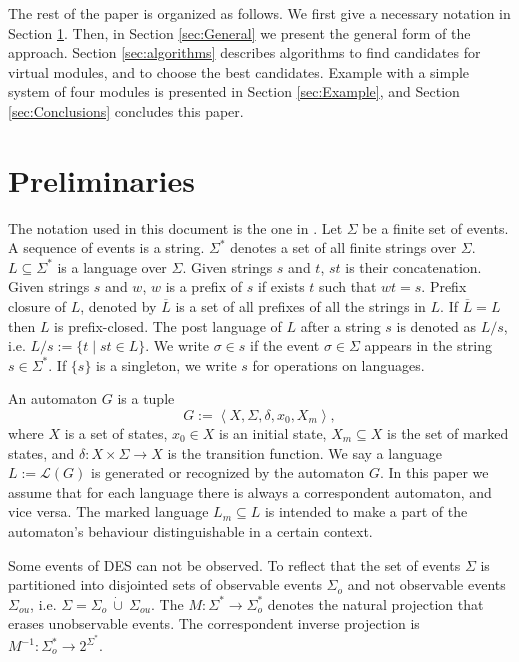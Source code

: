 \documentclass[a4paper, 10pt, conference]{ieeeconf}
\begin{document}
The rest of the paper is organized as follows. We first give a necessary
notation in Section \ref{sec:Preliminaries}. Then, in Section \ref{sec:General}
we present the general form of the approach. Section \ref{sec:algorithms}
describes algorithms to find candidates for virtual modules, and to choose the
best candidates. Example with a simple system of four modules is presented in
Section \ref{sec:Example}, and Section \ref{sec:Conclusions} concludes this
paper.


\section{Preliminaries}
\label{sec:Preliminaries}

The notation used in this document is the one in
\cite{cassandras_introduction_2010}.
Let $\Sigma$ be a finite set of events. A sequence of events is a string.
$\Sigma^*$ denotes a set of all finite strings over $\Sigma$.
$L\subseteq\Sigma^*$ is a language over $\Sigma$. Given strings $s$ and $t$,
$st$ is their concatenation. Given strings $s$ and $w$, $w$ is a prefix of $s$
if exists $t$ such that $wt = s$. Prefix closure of $L$, denoted by
$\overline{L}$ is a set of all prefixes of all the strings in $L$.
If $\overline{L} = L$ then $L$ is prefix-closed. The post language of $L$ after
a string $s$ is denoted as $L/s$, i.e. $L/s := \{t\mid st \in L\}$. We
write $\sigma \in s$ if the event $\sigma \in \Sigma$ appears in the string $s
\in \Sigma^*$. If $\{s\}$ is a singleton, we write $s$ for operations on
languages.

An automaton $G$ is a tuple $$G := \left< X,\Sigma,\delta,x_0, X_m \right>,$$
where $X$ is a set of states, $x_0 \in X$ is an initial state, $X_m \subseteq X$
is the set of marked states, and $\delta: X \times \Sigma \rightarrow X$ is the
transition function.
We say a language $L := \mathcal{L}(G)$ is generated or recognized by the
automaton $G$. In this paper we assume that for each language there is always a
correspondent automaton, and vice versa. The marked language $L_m \subseteq L$
is intended to make a part of the automaton's behaviour distinguishable in a
certain context.

Some events of DES can not be observed. To reflect that the set of events
$\Sigma$ is partitioned into disjointed sets of observable events $\Sigma_o$ and
not observable events $\Sigma_{ou}$, i.e. $\Sigma = \Sigma_o~\dot{\cup}~
\Sigma_{ou}$.
The $M: \Sigma^* \rightarrow \Sigma_o^*$ denotes the natural projection that
erases unobservable events.
The correspondent inverse projection is $M^{-1}: \Sigma_o^* \rightarrow
2^{\Sigma^*}$.
\end{document}
